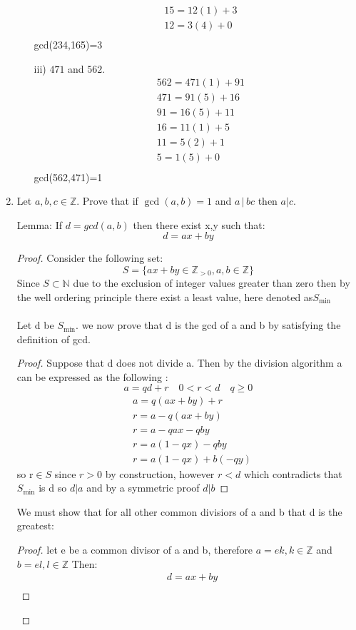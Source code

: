 \documentclass[11pt]{article}
\theoremstyle{definition}  %
\newcommand{\Z}{\mathbb{Z}}
\newcommand{\N}{\mathbb{N}}
\begin{document}
\begin{enumerate}
\begin{itemize}
\begin{align*}
  &15=12(1)+3\\
  &12=3(4)+0\\
\end{align*}
  gcd(234,165)=3
  \item[iii)] $471$ and $562$.
  \begin{align*}
  &562=471(1)+91\\
  &471=91(5)+16\\
  &91=16(5)+11\\
  &16=11(1)+5\\
  &11=5(2)+1\\
  &5=1(5)+0\\
\end{align*}
gcd(562,471)=1
  \end{itemize}
\item Let $a, b, c \in \Z$. Prove that if $\gcd(a,b) =1$ and $a \, | \, bc$ then $a | c$.\\
\begin{lemma}
  Lemma:
If $d=gcd(a,b)$ then there exist x,y such that: \[
  d=ax+by
\]
\begin{proof}
  Consider the following set:
\[
  S=\{ax+by\in \Z_{>0}, a,b\in \Z\}
\]
Since $S\subset \N$ due to the exclusion of integer values greater than zero then by the well ordering principle there exist a least value, here denoted as$S_{\min}$\\\\
Let d be $S_{\min}$. we now prove that d is the gcd of a and b by satisfying the definition of gcd.
\begin{proof}
  Suppose that d does not divide a. Then by the division algorithm a can be expressed as the following :
  \[
    a=qd+r\quad 0<r<d\quad q\geq 0
  \]
\begin{align*}
  &a=q(ax+by)+r\\
  &r=a-q(ax+by)\\
  &r=a-qax-qby\\
  &r=a(1-qx)-qby\\
  &r=a(1-qx)+b(-qy)
\end{align*}
so r$\in S$ since $r>0$ by construction, however $r<d$ which contradicts that $S_{\min}$ is d so $d|a$ and by a symmetric proof $d|b$
\end{proof}
We must show that for all other common divisiors of a and b that d is the greatest:
\begin{proof}
  let e be a common divisor of a and b, therefore $a=ek,k\in \Z$ and $b=el,l\in \Z$ Then:
  \begin{align*}
    &d=ax+by\\

\end{align*}
\end{proof}
\end{proof}
\end{lemma}
\end{enumerate}
\end{document}

